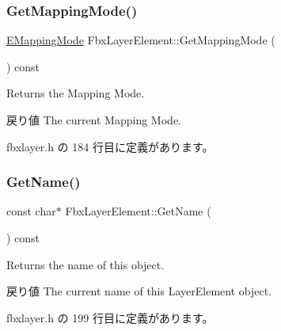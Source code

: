 \mbox{\label{class_fbx_layer_element_a3b20bf41d0b5abc9661b8b93e033cddb}} 
\subsubsection{\texorpdfstring{Get\+Mapping\+Mode()}{GetMappingMode()}}
{\footnotesize\ttfamily \hyperlink{class_fbx_layer_element_a5a40e95db30ae9f94611dc3f1568af26}{E\+Mapping\+Mode} Fbx\+Layer\+Element\+::\+Get\+Mapping\+Mode (\begin{DoxyParamCaption}{ }\end{DoxyParamCaption}) const\hspace{0.3cm}{\ttfamily [inline]}}

Returns the Mapping Mode. \begin{DoxyReturn}{戻り値}
The current Mapping Mode. 
\end{DoxyReturn}


 fbxlayer.\+h の 184 行目に定義があります。

\mbox{\label{class_fbx_layer_element_af6ca442eaaaac61cec689cf7e39138a6}} 
\subsubsection{\texorpdfstring{Get\+Name()}{GetName()}}
{\footnotesize\ttfamily const char$\ast$ Fbx\+Layer\+Element\+::\+Get\+Name (\begin{DoxyParamCaption}{ }\end{DoxyParamCaption}) const\hspace{0.3cm}{\ttfamily [inline]}}

Returns the name of this object. \begin{DoxyReturn}{戻り値}
The current name of this Layer\+Element object. 
\end{DoxyReturn}


 fbxlayer.\+h の 199 行目に定義があります。

\mbox{\label{class_fbx_layer_element_a1e83210626684c844505ffd115c27dfd}} 

